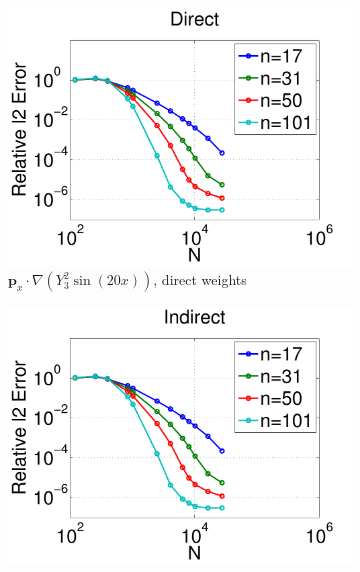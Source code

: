 \begin{figure}
	\centering
	\begin{subfigure}[t]{0.48\textwidth}
	\includegraphics[width=1.0\textwidth]{../figures/appendices/direct_vs_indirect_weights/compare_weight_generation/xsfc_vs_xsfc_alt_on_sph32_times_sine_20x/direct_rel_l2_error-eps-converted-to.pdf}
	\caption{$\mathbf{p}_{x} \cdot \nabla ( Y_{3}^{2} \sin(20 x))$, direct weights}
			\label{fig:direct_vs_indirect_relative_error_xsfc_direct}
	\end{subfigure}
	\begin{subfigure}[t]{0.48\textwidth}
	\includegraphics[width=1.0\textwidth]{../figures/appendices/direct_vs_indirect_weights/compare_weight_generation/xsfc_vs_xsfc_alt_on_sph32_times_sine_20x/indirect_rel_l2_error-eps-converted-to.pdf}

\end{subfigure}
\end{figure}
